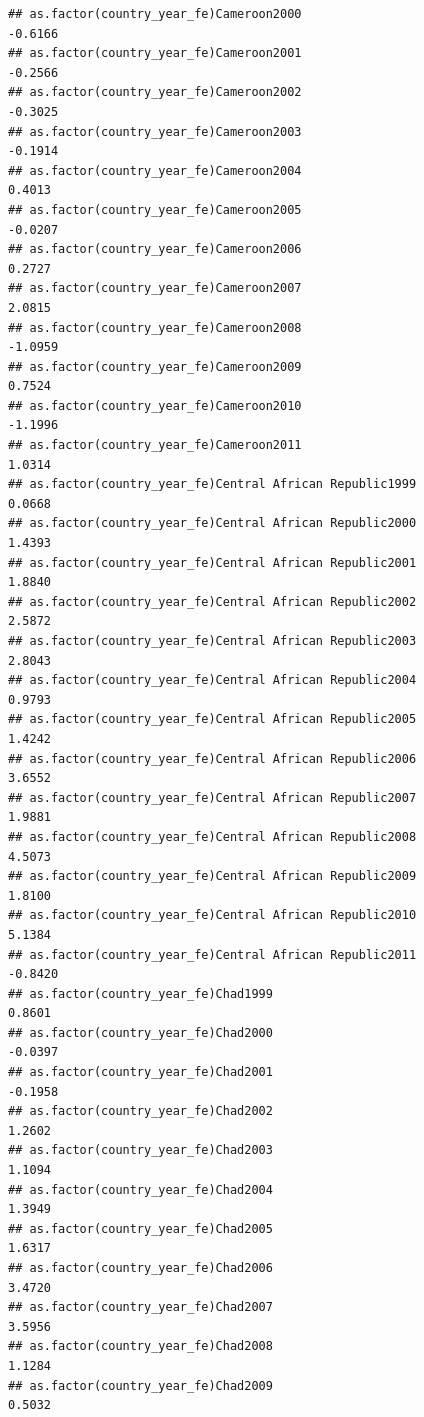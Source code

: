 \documentclass[
  a4paper,
]{article}
\begin{document}
\begin{verbatim}
## as.factor(country_year_fe)Cameroon2000                         -0.6166
## as.factor(country_year_fe)Cameroon2001                         -0.2566
## as.factor(country_year_fe)Cameroon2002                         -0.3025
## as.factor(country_year_fe)Cameroon2003                         -0.1914
## as.factor(country_year_fe)Cameroon2004                          0.4013
## as.factor(country_year_fe)Cameroon2005                         -0.0207
## as.factor(country_year_fe)Cameroon2006                          0.2727
## as.factor(country_year_fe)Cameroon2007                          2.0815
## as.factor(country_year_fe)Cameroon2008                         -1.0959
## as.factor(country_year_fe)Cameroon2009                          0.7524
## as.factor(country_year_fe)Cameroon2010                         -1.1996
## as.factor(country_year_fe)Cameroon2011                          1.0314
## as.factor(country_year_fe)Central African Republic1999          0.0668
## as.factor(country_year_fe)Central African Republic2000          1.4393
## as.factor(country_year_fe)Central African Republic2001          1.8840
## as.factor(country_year_fe)Central African Republic2002          2.5872
## as.factor(country_year_fe)Central African Republic2003          2.8043
## as.factor(country_year_fe)Central African Republic2004          0.9793
## as.factor(country_year_fe)Central African Republic2005          1.4242
## as.factor(country_year_fe)Central African Republic2006          3.6552
## as.factor(country_year_fe)Central African Republic2007          1.9881
## as.factor(country_year_fe)Central African Republic2008          4.5073
## as.factor(country_year_fe)Central African Republic2009          1.8100
## as.factor(country_year_fe)Central African Republic2010          5.1384
## as.factor(country_year_fe)Central African Republic2011         -0.8420
## as.factor(country_year_fe)Chad1999                              0.8601
## as.factor(country_year_fe)Chad2000                             -0.0397
## as.factor(country_year_fe)Chad2001                             -0.1958
## as.factor(country_year_fe)Chad2002                              1.2602
## as.factor(country_year_fe)Chad2003                              1.1094
## as.factor(country_year_fe)Chad2004                              1.3949
## as.factor(country_year_fe)Chad2005                              1.6317
## as.factor(country_year_fe)Chad2006                              3.4720
## as.factor(country_year_fe)Chad2007                              3.5956
## as.factor(country_year_fe)Chad2008                              1.1284
## as.factor(country_year_fe)Chad2009                              0.5032

\end{verbatim}
\end{document}
